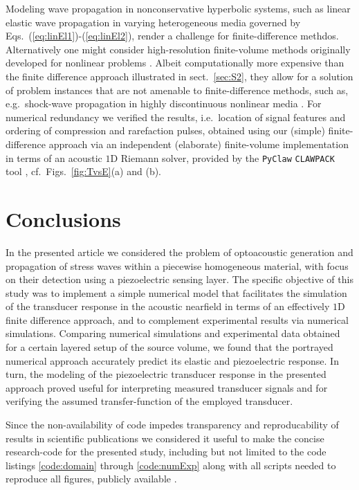 \documentclass[5p,times,twocolumn]{elsarticle}
\begin{document}
Modeling wave propagation in nonconservative hyperbolic systems, such as linear
elastic wave propagation in varying heterogeneous media governed by Eqs.\
(\ref{eq:linEl1})-(\ref{eq:linEl2}), render a challenge for finite-difference
methdos. Alternatively one might consider high-resolution finite-volume methods
originally developed for nonlinear problems \cite{Fogarty:1999,LeVeque:1997}.
Albeit computationally more expensive than the finite difference approach
illustrated in sect.\ \ref{sec:S2}, they allow for a solution of problem
instances that are not amenable to finite-difference methods, such as, e.g.\
shock-wave propagation in highly discontinuous nonlinear media
\cite{Berezovski:2006}. For numerical redundancy we verified the results, i.e.\
location of signal features and ordering of compression and rarefaction pulses,
obtained using our (simple) finite-difference approach via an independent
(elaborate) finite-volume implementation in terms of an acoustic $1$D Riemann
solver, provided by the {\tt{PyClaw}} {\tt{CLAWPACK}} tool
\cite{Ketcheson:2012,Clawpack:2017}, cf.\ Figs.\ \ref{fig:TvsE}(a) and (b).

\section{Conclusions}
\label{sec:S5}

In the presented article we considered the problem of optoacoustic generation
and propagation of stress waves within a piecewise homogeneous material, with
focus on their detection using a piezoelectric sensing layer.  The specific
objective of this study was to implement a simple numerical model that
facilitates the simulation of the transducer response in the acoustic nearfield
in terms of an effectively $1$D finite difference approach, and to complement
experimental results via numerical simulations.  Comparing numerical
simulations and experimental data obtained for a certain layered setup of the
source volume, we found that the portrayed numerical approach accurately
predict its elastic and piezoelectric response. In turn, the modeling of the
piezoelectric transducer response in the presented approach proved useful for
interpreting measured transducer signals and for verifying the assumed
transfer-function of the employed transducer.

Since the non-availability of code impedes transparency and reproducability of
results in scientific publications \cite{Barnes:2010,Ince:2012,Sandve:2013} we
considered it useful to make the concise research-code for the presented study,
including but not limited to the code listings \ref{code:domain} through
\ref{code:numExp} along with all scripts needed to reproduce all figures,
publicly available \cite{Melchert_gitHub_1DFD:2017}.
\end{document}

